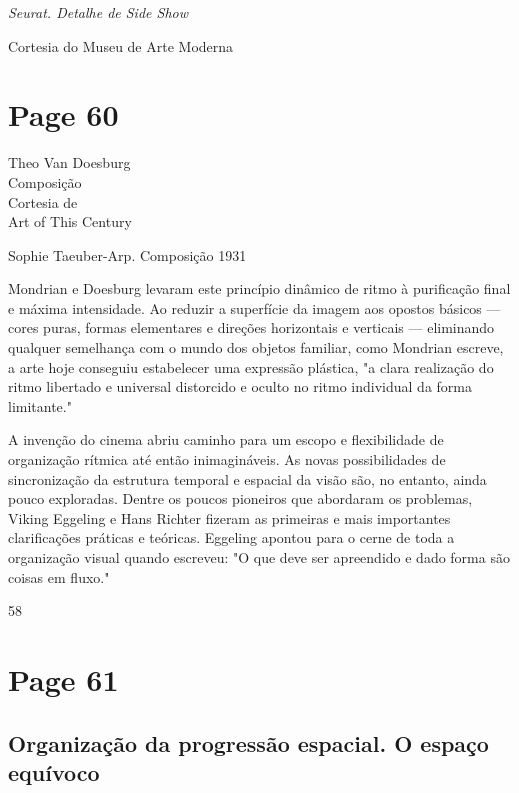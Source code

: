 \documentclass[a4paper]{article}
\begin{document}
\textit{Seurat. Detalhe de Side Show}

Cortesia do Museu de Arte Moderna

\newpage
\section*{Page 60}

Theo Van Doesburg\\
Composição\\
Cortesia de\\
Art of This Century

Sophie Taeuber-Arp. Composição 1931

Mondrian e Doesburg levaram este princípio dinâmico de ritmo à purificação final e máxima intensidade. Ao reduzir a superfície da imagem aos opostos básicos --- cores puras, formas elementares e direções horizontais e verticais --- eliminando qualquer semelhança com o mundo dos objetos familiar, como Mondrian escreve, a arte hoje conseguiu estabelecer uma expressão plástica, "a clara realização do ritmo libertado e universal distorcido e oculto no ritmo individual da forma limitante."

A invenção do cinema abriu caminho para um escopo e flexibilidade de organização rítmica até então inimagináveis. As novas possibilidades de sincronização da estrutura temporal e espacial da visão são, no entanto, ainda pouco exploradas. Dentre os poucos pioneiros que abordaram os problemas, Viking Eggeling e Hans Richter fizeram as primeiras e mais importantes clarificações práticas e teóricas. Eggeling apontou para o cerne de toda a organização visual quando escreveu: "O que deve ser apreendido e dado forma são coisas em fluxo."

58

\newpage
\section*{Page 61}

\subsection*{Organização da progressão espacial. O espaço equívoco}
\end{document}

